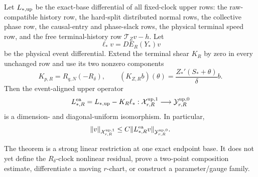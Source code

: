 \begin{theorem}
Let \(L_{*,\rm up}\) be the exact-base differential of all fixed-clock
upper rows: the raw-compatible history row, the hard-split distributed
normal rows, the collective phase row, the causal-entry and phase-slack
rows, the physical terminal speed row, and the free terminal-history row
\(\mathcal T_Zv-h\).  Let
\begin{equation}
 \ell_*v=DE_R(Y_*)v                                      \label{eq:long-window-event-functional}
\end{equation}
be the physical event differential.  Extend the terminal shear
\(K_R\) by zero in every unchanged row and use its two nonzero components
\begin{equation}
 K_{p,R}=R_{q,N}(-R_\delta),\qquad
 (K_{Z,R}b)(\theta)=\frac{Z_*'(S_*+\theta)}\delta b.
                                                        \label{eq:long-window-upper-shear}
\end{equation}
Then the event-aligned upper operator
\begin{equation}
 L_{*,R}^{\rm ea}=L_{*,\rm up}-K_R\ell_*:
 \mathcal X_{r,R}^{\rm up,1}
 \longrightarrow\mathcal Y_{r,R}^{\rm up,0}              \label{eq:long-window-event-aligned-isomorphism}
\end{equation}
is a dimension- and diagonal-uniform isomorphism.  In particular,
\begin{equation}
 \|v\|_{\mathcal X_{r,R}^{\rm up,1}}
 \le C\|L_{*,R}^{\rm ea}v\|_{\mathcal Y_{r,R}^{\rm up,0}}.
                                                        \label{eq:long-window-strong-inverse-bound}
\end{equation}

The theorem is a strong linear restriction at one exact endpoint base.
It does not yet define the \(R_\delta\)-clock nonlinear residual, prove a
two-point composition estimate, differentiate a moving \(r\)-chart, or
construct a parameter/gauge family.
\end{theorem}

